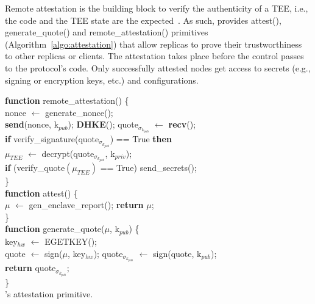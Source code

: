  Remote attestation is the building block to verify the authenticity of a TEE, i.e., the code and the TEE state are the expected~\cite{Parno2010}. As such, \projecttitle{} provides attest(), generate\_quote() and remote\_attestation() primitives (Algorithm~\ref{algo:attestation}) that allow replicas to prove their trustworthiness to other replicas or clients. The attestation takes place before the control passes to the protocol's code. Only successfully attested nodes get access to secrets (e.g., signing or encryption keys, etc.) and configurations. 


\begin{algorithm}[t]
\SetAlgoLined
\small

\textbf{function} remote\_attestation() \{ \\
 \Indp
 nonce $\leftarrow$ generate\_nonce();\\
 \textbf{send}(nonce, k$_{pub}$); \textbf{DHKE}(); quote$_{\sigma_{k_{pub}}}$ $\leftarrow$ \textbf{recv}();\\
 \textbf{if} verify\_signature(quote$_{\sigma_{k_{pub}}}$) == True \textbf{then}\\
    \Indp
        $\mu_{TEE}$ $\leftarrow$ decrypt(quote$_{\sigma_{k_{pub}}}$, k$_{priv}$);\\
        \textbf{if} (verify\_quote$(\mu_{TEE})$ == True) send\_secrets();\\
    \Indm
 \Indm
\} \\


\textbf{function} attest() \{ \\
\Indp
    $\mu$ $\leftarrow$ gen\_enclave\_report(); \textbf{return} $\mu$;\\ 
\Indm
\} \\

\textbf{function} generate\_quote($\mu$, k$_{pub}$) \{ \\
\Indp
    key$_{hw}$ $\leftarrow$ EGETKEY();\\
    quote $\leftarrow$ sign($\mu$, key$_{hw}$); 
    quote$_{\sigma_{k_{pub}}}$ $\leftarrow$ sign(quote, k$_{pub}$);\\
    \textbf{return } quote$_{\sigma_{k_{pub}}}$;\\
\Indm
\} \\
\caption{\projecttitle{}'s attestation primitive.}
\label{algo:attestation}
\vspace{-3pt}
\end{algorithm}






